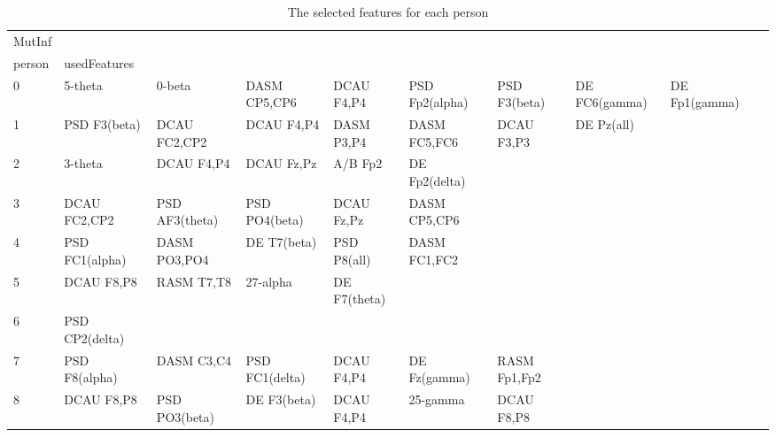 \clearpage
\begin{landscape}
\begin{table}[]
\centering
\caption{The selected features for each person}
\begin{tabular}{l|llllllll}
MutInf   &                &                &                &                &                &                &               &                &               &               \\
person   & usedFeatures   &                &                &                &                &                &               &                &               &               \\
0        & 5-theta        & 0-beta         & DASM CP5,CP6   & DCAU F4,P4     & PSD Fp2(alpha) & PSD F3(beta)   & DE FC6(gamma) & DE Fp1(gamma)  &               &               \\
1        & PSD F3(beta)   & DCAU FC2,CP2   & DCAU F4,P4     & DASM P3,P4     & DASM FC5,FC6   & DCAU F3,P3     & DE Pz(all)    &                &               &               \\
2        & 3-theta        & DCAU F4,P4     & DCAU Fz,Pz     & A/B Fp2        & DE Fp2(delta)  &                &               &                &               &               \\
3        & DCAU FC2,CP2   & PSD AF3(theta) & PSD PO4(beta)  & DCAU Fz,Pz     & DASM CP5,CP6   &                &               &                &               &               \\
4        & PSD FC1(alpha) & DASM PO3,PO4   & DE T7(beta)    & PSD P8(all)    & DASM FC1,FC2   &                &               &                &               &               \\
5        & DCAU F8,P8     & RASM T7,T8     & 27-alpha       & DE F7(theta)   &                &                &               &                &               &               \\
6        & PSD CP2(delta) &                &                &                &                &                &               &                &               &               \\
7        & PSD F8(alpha)  & DASM C3,C4     & PSD FC1(delta) & DCAU F4,P4     & DE Fz(gamma)   & RASM Fp1,Fp2   &               &                &               &               \\
8        & DCAU F8,P8     & PSD PO3(beta)  & DE F3(beta)    & DCAU F4,P4     & 25-gamma       & DCAU F8,P8     &               &                &               &               \\

\end{tabular}
\end{table}
\end{landscape}
